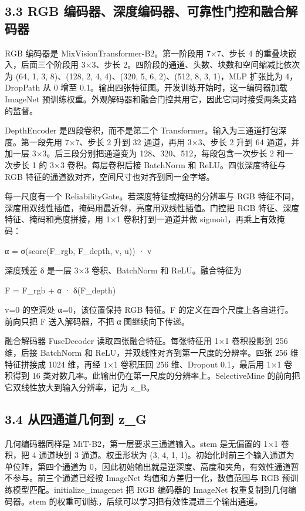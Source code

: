 \documentclass[UTF8,a4paper,11pt]{ctexart}
\begin{document}
\subsection*{3.3 RGB 编码器、深度编码器、可靠性门控和融合解码器}
RGB 编码器是 MixVisionTransformer-B2。第一阶段用 7×7、步长 4 的重叠块嵌入，后面三个阶段用 3×3、步长 2。四阶段的通道、头数、块数和空间缩减比依次为 (64, 1, 3, 8)、(128, 2, 4, 4)、(320, 5, 6, 2)、(512, 8, 3, 1)，MLP 扩张比为 4，DropPath 从 0 增至 0.1。输出四张特征图。开发训练开始时，这一编码器加载 ImageNet 预训练权重。外观解码器和融合门控共用它，因此它同时接受两条支路的监督。

DepthEncoder 是四段卷积，而不是第二个 Transformer。输入为三通道打包深度。第一段先用 7×7、步长 2 升到 32 通道，再用 3×3、步长 2 升到 64 通道，并加一层 3×3。后三段分别把通道变为 128、320、512，每段包含一次步长 2 和一次步长 1 的 3×3 卷积。每层卷积后接 BatchNorm 和 ReLU。四张深度特征与 RGB 特征的通道数对齐，空间尺寸也对齐到同一金字塔。

每一尺度有一个 ReliabilityGate。若深度特征或掩码的分辨率与 RGB 特征不同，深度用双线性插值，掩码用最近邻，亮度用双线性插值。门控把 RGB 特征、深度特征、掩码和亮度拼接，用 1×1 卷积打到一通道并做 sigmoid，再乘上有效掩码：

α = σ(score(F\_rgb, F\_depth, v, u)) · v

深度残差 δ 是一层 3×3 卷积、BatchNorm 和 ReLU。融合特征为

F = F\_rgb + α · δ(F\_depth)

v=0 的空洞处 α=0，该位置保持 RGB 特征。F 的定义在四个尺度上各自进行。前向只把 F 送入解码器，不把 α 图继续向下传递。

融合解码器 FuseDecoder 读取四张融合特征。每张特征用 1×1 卷积投影到 256 维，后接 BatchNorm 和 ReLU，并双线性对齐到第一尺度的分辨率。四张 256 维特征拼接成 1024 维，再经 1×1 卷积压回 256 维、Dropout 0.1，最后用 1×1 卷积得到 16 类对数几率。此输出仍在第一尺度的分辨率上。SelectiveMine 的前向把它双线性放大到输入分辨率，记为 z\_B。

\subsection*{3.4 从四通道几何到 z\_G}
几何编码器同样是 MiT-B2，第一层要求三通道输入。stem 是无偏置的 1×1 卷积，把 4 通道映到 3 通道。权重形状为 (3, 4, 1, 1)。初始化时前三个输入通道为单位阵，第四个通道为 0，因此初始输出就是逆深度、高度和夹角，有效性通道暂不参与。前三个通道已经按 ImageNet 均值和方差归一化，数值范围与 RGB 预训练模型匹配。initialize\_imagenet 把 RGB 编码器的 ImageNet 权重复制到几何编码器。stem 的权重可训练，后续可以学习把有效性混进三个输出通道。
\end{document}
